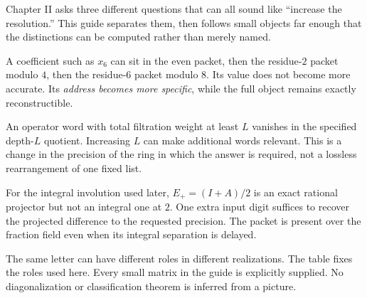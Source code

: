 
Chapter II asks three different questions that can all sound like ``increase the resolution.'' This guide separates them, then follows small objects far enough that the distinctions can be computed rather than merely named.


A coefficient such as $x_6$ can sit in the even packet, then the residue-$2$ packet modulo $4$, then the residue-$6$ packet modulo $8$. Its value does not become more accurate. Its \emph{address becomes more specific}, while the full object remains exactly reconstructible.

An operator word with total filtration weight at least $L$ vanishes in the specified depth-$L$ quotient. Increasing $L$ can make additional words relevant. This is a change in the precision of the ring in which the answer is required, not a lossless rearrangement of one fixed list.

For the integral involution used later, $E_+=(I+A)/2$ is an exact rational projector but not an integral one at $2$. One extra input digit suffices to recover the projected difference to the requested precision. The packet is present over the fraction field even when its integral separation is delayed.


The same letter can have different roles in different realizations. The table fixes the roles used here. Every small matrix in the guide is explicitly supplied. No diagonalization or classification theorem is inferred from a picture.

